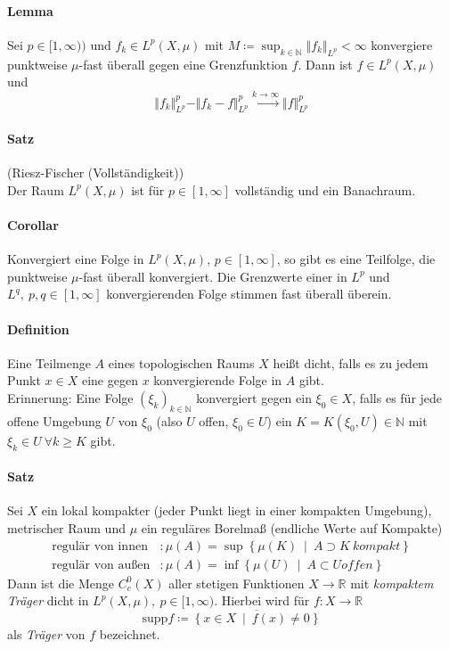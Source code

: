\documentclass[12pt,a4paper,fleqn]{article}
\def\set#1{{\left\{ #1 \right\}}}
\def\Mid{\ \middle|\ }
\begin{document}
\paragraph{Lemma} Sei $p \in [1, \infty))$ und $f_k \in {L}^p(X, \mu)$ mit $M \coloneqq \sup_{k \in \mathbb{N}} \Vert f_k \Vert_{L^p} < \infty$ konvergiere punktweise $\mu$-fast überall gegen eine Grenzfunktion $f$. Dann ist $f \in {L}^p(X, \mu)$ und 
\begin{displaymath}
\Vert f_k \Vert^p_{L^p} - \Vert f_k - f \Vert^p_{L^p} \xrightarrow{k \rightarrow \infty} \Vert f \Vert^p_{L^p}
\end{displaymath}

\paragraph{Satz} (Riesz-Fischer (Vollständigkeit))\\
Der Raum ${L}^p(X, \mu)$ ist für $p \in [1, \infty]$ vollständig und ein Banachraum.

\paragraph{Corollar} Konvergiert eine Folge in ${L}^p(X, \mu)$, $p \in [1, \infty]$, so gibt es eine Teilfolge, die punktweise $\mu$-fast überall konvergiert. Die Grenzwerte einer in ${L}^p$ und \mbox{${L}^q,\ p, q \in [1, \infty]$} konvergierenden Folge stimmen fast überall überein.

\paragraph{Definition} Eine Teilmenge $A$ eines topologischen Raums $X$ heißt dicht, falls es zu jedem Punkt $x \in X$ eine gegen $x$ konvergierende Folge in $A$ gibt.\\
Erinnerung: Eine Folge $(\xi_k)_{k \in \mathbb{N}}$ konvergiert gegen ein $\xi_0 \in X$, falls es für jede offene Umgebung $U$ von $\xi_0$ (also $U$ offen, $\xi_0 \in U$) ein $K = K(\xi_0, U) \in \mathbb{N}$ mit $\xi_k \in U\ \forall k \geq K$ gibt.

\paragraph{Satz} Sei $X$ ein lokal kompakter (jeder Punkt liegt in einer kompakten Umgebung), metrischer Raum und $\mu$ ein reguläres Borelmaß (endliche Werte auf Kompakte)
\begin{align*}
\text{regulär von innen}&\colon \mu(A) = \sup \set{\mu(K) \Mid A \supset K\ kompakt}\\
\text{regulär von außen}&\colon \mu(A) = \inf \set{\mu(U) \Mid A \subset U \mathit{offen}}
\end{align*}
Dann ist die Menge $C^0_c(X)$ aller stetigen Funktionen $X \rightarrow \mathbb{R}$ mit \textit{kompaktem Träger} dicht in $L^p(X, \mu),\ p \in [1, \infty)$. Hierbei wird für $f\colon X \rightarrow\mathbb{R}$
\begin{displaymath}
\text{supp} f \coloneqq \overline{\set{x \in X \Mid f(x) \not = 0}}
\end{displaymath}
als \textit{Träger} von $f$ bezeichnet.
\end{document}
